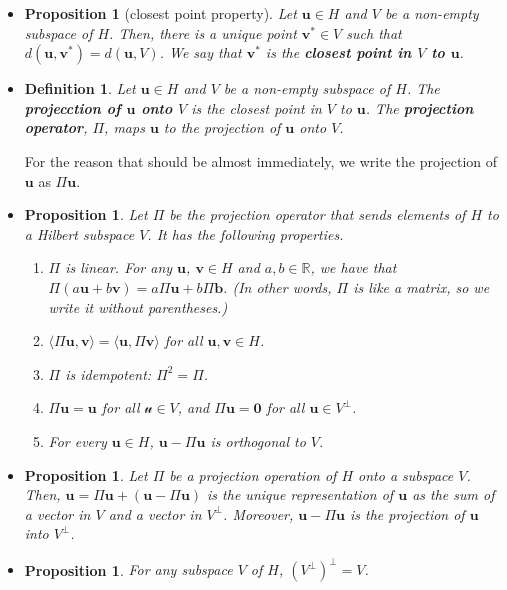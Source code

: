 \documentclass[10pt]{article}
\newtheorem{definition}[lemma]{Definition}
\newtheorem{proposition}[lemma]{Proposition}
\numberwithin{lemma}{section}
\newcommand{\ve}[1]{\mathbf{#1}}
\newcommand{\mcal}[1]{\mathcal{#1}}
\newcommand{\Real}{\mathbb{R}}
\begin{document}
\begin{itemize}
  \item \begin{proposition}[closest point property]
    Let $\ve{u} \in H$ and $V$ be a non-empty subspace of $H$. Then, there is a unique point $\ve{v}^* \in V$ such that $d(\ve{u},\ve{v}^*) = d(\ve{u}, V)$. We say that $\ve{v}^*$ is the {\bf closest point in $V$ to $\ve{u}$}.   
  \end{proposition}

  \item \begin{definition}
    Let $\ve{u} \in H$ and $V$ be a non-empty subspace of $H$. The {\bf projecction of $\ve{u}$ onto $V$} is the closest point in $V$ to $\ve{u}$. The {\bf projection operator}, $\Pi$, maps $\ve{u}$ to the projection of $\ve{u}$ onto $V$. 
  \end{definition}

  For the reason that should be almost immediately, we write the projection of $\ve{u}$ as $\Pi\ve{u}$.

  \item \begin{proposition}
    Let $\Pi$ be the projection operator that sends elements of $H$ to a Hilbert subspace $V$. It has the following properties.
    \begin{enumerate}
      \item $\Pi$ is linear. For any $\ve{u}$, $\ve{v} \in H$ and $a, b \in \Real$, we have that $\Pi(a \ve{u} + b \ve{v}) = a\Pi\ve{u} + b\Pi\ve{b}$. (In other words, $\Pi$ is like a matrix, so we write it without parentheses.)
      
      \item $\langle \Pi \ve{u}, \ve{v} \rangle = \langle \ve{u}, \Pi \ve{v} \rangle$ for all $\ve{u}, \ve{v} \in H$.
      
      \item $\Pi$ is idempotent: $\Pi^2 = \Pi$.
      
      \item $\Pi\ve{u} = \ve{u}$ for all $\mcal{u} \in V$, and $\Pi\ve{u} = \ve{0}$ for all $\ve{u} \in V^\perp$.
      
      \item For every $\ve{u} \in H$, $\ve{u} - \Pi \ve{u}$ is orthogonal to $V$.
    \end{enumerate}
  \end{proposition}

  \item \begin{proposition}
    Let $\Pi$ be a projection operation of $H$ onto a subspace $V$. Then, $\ve{u} = \Pi \ve{u} + (\ve{u} - \Pi \ve{u})$ is the unique representation of $\ve{u}$ as the sum of a vector in $V$ and a vector in $V^\perp$. Moreover, $\ve{u} - \Pi\ve{u}$ is the projection of $\ve{u}$ into $V^{\perp}$.
  \end{proposition}

  \item \begin{proposition}
    For any subspace $V$ of $H$, $(V^\perp)^\perp = V$.
  \end{proposition}
\end{itemize}
\end{document}

